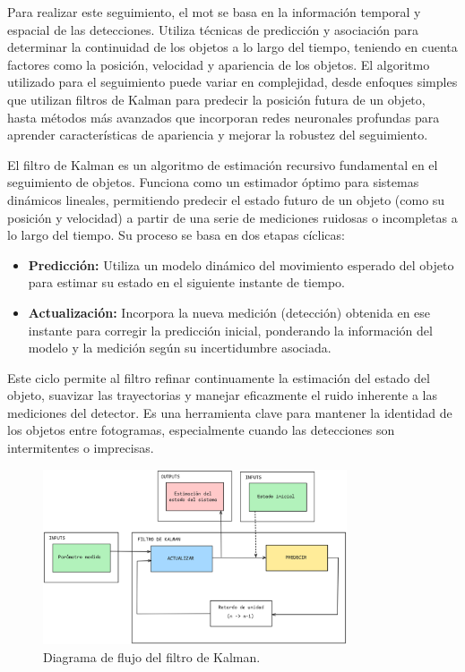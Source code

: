 \documentclass[11pt,spanish,listoffigures,listoftables]{tfgetsinf}
\begin{document}
Para realizar este seguimiento, el \gls{mot} se basa en la información temporal y espacial de las detecciones. Utiliza técnicas de predicción y asociación para determinar la continuidad de los objetos a lo largo del tiempo, teniendo en cuenta factores como la posición, velocidad y apariencia de los objetos. El algoritmo utilizado para el seguimiento puede variar en complejidad, desde enfoques simples que utilizan filtros de Kalman para predecir la posición futura de un objeto, hasta métodos más avanzados que incorporan redes neuronales profundas para aprender características de apariencia y mejorar la robustez del seguimiento.


El filtro de Kalman es un algoritmo de estimación recursivo fundamental en el seguimiento de objetos. Funciona como un estimador óptimo para sistemas dinámicos lineales, permitiendo predecir el estado futuro de un objeto (como su posición y velocidad) a partir de una serie de mediciones ruidosas o incompletas a lo largo del tiempo. Su proceso se basa en dos etapas cíclicas:
\begin{itemize}
   \item \textbf{Predicción:} Utiliza un modelo dinámico del movimiento esperado del objeto para estimar su estado en el siguiente instante de tiempo.
   \item \textbf{Actualización:} Incorpora la nueva medición (detección) obtenida en ese instante para corregir la predicción inicial, ponderando la información del modelo y la medición según su incertidumbre asociada.
\end{itemize}
Este ciclo permite al filtro refinar continuamente la estimación del estado del objeto, suavizar las trayectorias y manejar eficazmente el ruido inherente a las mediciones del detector. Es una herramienta clave para mantener la identidad de los objetos entre fotogramas, especialmente cuando las detecciones son intermitentes o imprecisas.



\begin{figure}[H]
   \centering
   \includegraphics[width=0.8\textwidth]{images/estado_del_arte/filtro_de_kalman.png}
   \caption{Diagrama de flujo del filtro de Kalman.}
   \label{fig:filtro_de_kalman}
\end{figure}
\end{document}
